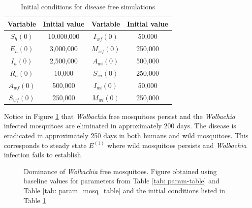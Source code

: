 \documentclass{ws-rv9x6}
\begin{document}
\begin{table}[h]
\centering
\caption{Initial conditions for disease free simulations
} 
\label{init-cond-dis-free-table}
\begin{tabular}{ c c c c } 
 \toprule
 Variable & Initial value & Variable & Initial value\\ 
  \midrule
 $S_h(0)$ & 10,000,000 & $I_{wf}(0)$ & 50,000\\
 $E_h(0)$ & 3,000,000 & $M_{wf}(0)$ & 250,000\\
 $I_h(0)$ & 2,500,000 & $A_{wi}(0)$ & 500,000 \\
 $R_h(0)$ & 10,000 & $S_{wi}(0)$ & 250,000 \\
 $A_{wf}(0)$ & 500,000 & $I_{wi}(0)$ & 50,000 \\
 $S_{wf}(0)$ & 250,000 & $M_{wi}(0)$ & 250,000\\
 \bottomrule
\end{tabular}
\end{table}

Notice in Figure \ref{fig:domwolbachiafree} 
that \textit{Wolbachia} free mosquitoes persist and the \textit{Wolbachia} infected mosquitoes are eliminated in approximately 200 days. The disease is eradicated in approximately 250 days in both humans and wild mosquitoes. This corresponds to steady state $E^{(1)}$ where wild mosquitoes persists and \textit{Wolbachia} infection fails to establish.


\begin{figure}[H]
    \centering
    
    \caption{Dominance of \textit{Wolbachia} free mosquitoes. Figure  obtained using baseline values for parameters from Table \ref{tab: param-table} and Table \ref{tab: param_mosq_table} and the initial conditions listed in Table \ref{init-cond-dis-free-table}}
    \label{fig:domwolbachiafree}
\end{figure}
\end{document}
